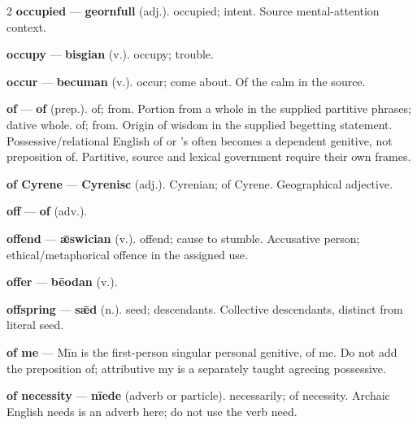 \begin{multicols}{2}
\textbf{occupied} — \textbf{geornfull} (adj.). occupied; intent. Source mental-attention context.\par
\textbf{occupy} — \textbf{bisgian} (v.). occupy; trouble.\par
\textbf{occur} — \textbf{becuman} (v.). occur; come about. Of the calm in the source.\par
\textbf{of} — \textbf{of} (prep.). of; from. Portion from a whole in the supplied partitive phrases; dative whole. of; from. Origin of wisdom in the supplied begetting statement. Possessive/relational English of or 's often becomes a dependent genitive, not preposition of. Partitive, source and lexical government require their own frames.\par
\textbf{of Cyrene} — \textbf{Cyrenisc} (adj.). Cyrenian; of Cyrene. Geographical adjective.\par
\textbf{off} — \textbf{of} (adv.).\par
\textbf{offend} — \textbf{ǣswician} (v.). offend; cause to stumble. Accusative person; ethical/metaphorical offence in the assigned use.\par
\textbf{offer} — \textbf{bēodan} (v.).\par
\textbf{offspring} — \textbf{sǣd} (n.). seed; descendants. Collective descendants, distinct from literal seed.\par
\textbf{of me} — Mīn is the first-person singular personal genitive, of me. Do not add the preposition of; attributive my is a separately taught agreeing possessive.\par
\textbf{of necessity} — \textbf{nīede} (adverb or particle). necessarily; of necessity. Archaic English needs is an adverb here; do not use the verb need.\par

\end{multicols}
